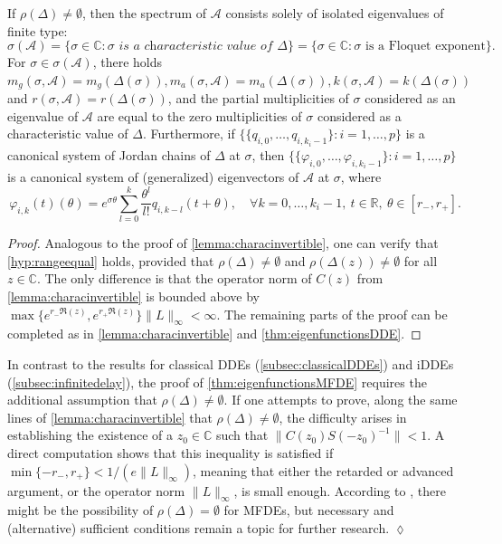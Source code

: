 \documentclass[english]{myarticle}
\begin{document}
\begin{sloppypar}
\begin{theorem} \label{thm:eigenfunctionsMFDE}
If $\rho(\Delta) \neq \emptyset$, then the spectrum of $\mathcal{A}$ consists solely of isolated eigenvalues of finite type:
\begin{equation*}
    \sigma(\mathcal{A}) =  \{ \sigma \in \mathbb{C} : \sigma \textit{ is a characteristic value of } \Delta \} = \{\sigma \in \mathbb{C} : \sigma \mbox{ is a Floquet exponent} \}.
\end{equation*}
For $\sigma \in \sigma(\mathcal{A})$, there holds $m_g(\sigma,\mathcal{A}) = m_g(\Delta(\sigma)), m_a(\sigma,\mathcal{A}) = m_a(\Delta(\sigma)),  k(\sigma,\mathcal{A}) = k(\Delta(\sigma))$ and $r(\sigma,\mathcal{A}) = r(\Delta(\sigma))$, and the partial multiplicities of $\sigma$ considered as an eigenvalue of $\mathcal{A}$ are equal to the zero multiplicities of $\sigma$ considered as a characteristic value of $\Delta$. Furthermore, if $\{ \{{q}_{i,0},\dots,{q}_{i,k_i-1} \} : i=1,\dots,p\}$ is a canonical system of Jordan chains of $\Delta$ at $\sigma$, then $\{ \{\varphi_{i,0},\dots,\varphi_{i,k_i-1} \} : i=1,\dots,p \}$ is a canonical system of (generalized) eigenvectors of $\mathcal{A}$ at $\sigma$, where
\begin{equation*}
    \varphi_{i,k}(t)(\theta) = e^{\sigma \theta} \sum_{l=0}^k \frac{\theta^l}{l!}q_{i,k-l}(t+\theta), \quad \forall k = 0,\dots,k_{i}-1, \  t \in \mathbb{R}, \ \theta \in [r_{-},r_{+}].
\end{equation*}
\end{theorem}
\begin{proof}
Analogous to the proof of \cref{lemma:characinvertible}, one can verify that \ref{hyp:rangeequal} holds, provided that $\rho(\Delta) \neq \emptyset$ and $\rho(\Delta(z)) \neq \emptyset$ for all $z \in \mathbb{C}$. The only difference is that the operator norm of $C(z)$ from \cref{lemma:characinvertible} is bounded above by $ \max \{e^{r_{-} \Re(z)},e^{r_{+} \Re (z)} \} \|L\|_\infty < \infty$. The remaining parts of the proof can be completed as in \cref{lemma:characinvertible} and \cref{thm:eigenfunctionsDDE}.
\end{proof}

\begin{remark} \label{remark:rhoDeltaMFDE}
In contrast to the results for classical DDEs (\cref{subsec:classicalDDEs}) and iDDEs (\cref{subsec:infinitedelay}), the proof of \cref{thm:eigenfunctionsMFDE} requires the additional assumption that $\rho(\Delta) \neq \emptyset$. If one attempts to prove, along the same lines of \cref{lemma:characinvertible} that $\rho(\Delta) \neq \emptyset$, the difficulty arises in establishing the existence of a $z_0 \in \mathbb{C}$ such that $\|C(z_0)S(-z_0)^{-1} \| < 1$. A direct computation shows that this inequality is satisfied if $\min\{-r_{-},r_{+} \} < 1/(e\|L\|_\infty)$, meaning that either the retarded or advanced argument, or the operator norm $\|L\|_\infty$, is small enough. According to \cite[Lemma 4.3.2]{Hupkes2008}, there might be the possibility of $\rho(\Delta) = \emptyset$ for MFDEs, but necessary and (alternative) sufficient conditions remain a topic for further research. \hfill $\lozenge$
\end{remark}


\end{sloppypar}
\end{document}
